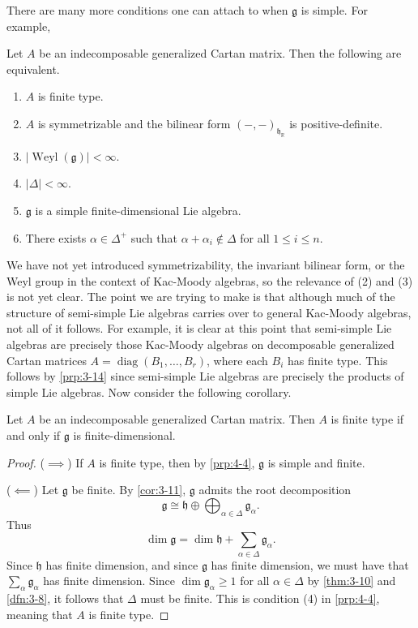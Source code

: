 \documentclass[11pt, letterpaper]{article}
\theoremstyle{plain}
\begin{document}
There are many more conditions one can attach to when $\mathfrak{g} $ is simple. For example,
\begin{proposition}\label{prp:4-4}
	Let $A$ be an indecomposable generalized Cartan matrix. Then the following are equivalent.
	\begin{enumerate}
		\item $A$ is finite type.
		\item $A$ is symmetrizable and the bilinear form $(-,-)_{\mathfrak{h} _{\mathbb{R} } } $ is positive-definite.
		\item $\left| \operatorname{Weyl}(\mathfrak{g} ) \right| < \infty $.
		\item $\left| \Delta  \right| <\infty $.
		\item $\mathfrak{g} $ is a simple finite-dimensional Lie algebra.
		\item There exists $\alpha \in \Delta^+$ such that $\alpha +\alpha _i \notin \Delta $ for all $1\leq i\leq n$.
	\end{enumerate}
\end{proposition}
We have not yet introduced symmetrizability, the invariant bilinear form, or the Weyl group in the context of Kac-Moody algebras, so the relevance of (2) and (3) is not yet clear. The point we are trying to make is that although much of the structure of semi-simple Lie algebras carries over to general Kac-Moody algebras, not all of it follows. For example, it is clear at this point that semi-simple Lie algebras are precisely those Kac-Moody algebras on decomposable generalized Cartan matrices $A=\operatorname{diag} (B_1, \ldots ,B_r)$, where each $B_i$ has finite type. This follows by \cref{prp:3-14} since semi-simple Lie algebras are precisely the products of simple Lie algebras. Now consider the following corollary.

\begin{corollary}\label{cor:4-5}
	Let $A$ be an indecomposable generalized Cartan matrix. Then $A$ is finite type if and only if $\mathfrak{g} $ is finite-dimensional.
\end{corollary}
\begin{proof}
	($\implies $) If $A$ is finite type, then by \cref{prp:4-4}, $\mathfrak{g} $ is simple and finite.

	($\impliedby $) Let $\mathfrak{g} $ be finite. By \cref{cor:3-11}, $\mathfrak{g} $ admits the root decomposition
	\[
		\mathfrak{g} \cong \mathfrak{h} \oplus \bigoplus_{\alpha \in \Delta } \mathfrak{g}_{\alpha } 
	.\]
	Thus
	\[
		\dim \mathfrak{g} = \dim \mathfrak{h} + \sum_{\alpha \in \Delta } \mathfrak{g} _{\alpha } 
	.\]
	Since $\mathfrak{h} $ has finite dimension, and since $\mathfrak{g} $ has finite dimension, we must have that $\sum_{\alpha } \mathfrak{g} _\alpha $ has finite dimension. Since $\dim \mathfrak{g} _{\alpha } \geq 1$ for all $\alpha \in \Delta $ by \cref{thm:3-10} and \cref{dfn:3-8}, it follows that $\Delta $ must be finite. This is condition (4) in \cref{prp:4-4}, meaning that $A$ is finite type.
\end{proof}
\end{document}
